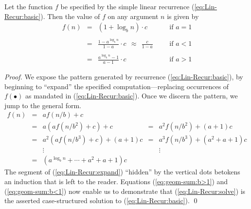 \begin{theorem}
\label{thm:master-thm-simple}
Let the function $f$ be specified by the simple linear recurrence
(\ref{eq:Lin-Recur:basic}).  Then the value of $f$ on any argument $n$
is given by
\begin{equation}
\label{eq:Lin-Recur:solve}
\begin{array}{lcllll}
f(n) & = & (1 + \log_b n) \cdot c &  &  & \mbox{if } a=1 \\
     &   &                 &  &  & \\
     & = &
  {\displaystyle
  \frac{1-a^{\log_b n}}{1-a} \cdot c \ \ \approx \ \ \frac{c}{1-a}
  }
                           &  &  & \mbox{if } a<1 \\
    &   &                  &  &  & \\
    & = &
  {\displaystyle
\frac{a^{\log_b n} -1}{a-1} \cdot c
  }
                           &  &  & \mbox{if } a>1
\end{array}
\end{equation}
\end{theorem}

\begin{proof}
We expose the pattern generated by recurrence
(\ref{eq:Lin-Recur:basic}), by beginning to ``expand'' the specified
computation---replacing occurrences of $f(\bullet)$ as mandated in
(\ref{eq:Lin-Recur:basic}).  Once we discern the pattern, we jump to
the general form.
\begin{equation}
\label{eq:Lin-Recur:expand}
\begin{array}{lcccc}
f(n) & = & a f(n/b) + c & & \\
     & = & a \left( a f(n/b^2) + c \right) + c
             & = & a^2 f(n/b^2) + (a+1)c \\
     & = & a^2 \left( a f(n/b^3) + c \right) + (a+1)c
             & = & a^3 f(n/b^3) + (a^2+a+1)c \\
     &   & \vdots & & \vdots \\
     & = & 
{\displaystyle
\left(a^{\log_b n} + \cdots +a^2+a+1 \right) c
} & &
\end{array}
\end{equation}
The segment of (\ref{eq:Lin-Recur:expand}) ``hidden'' by the vertical
dots betokens an induction that is left to the reader.  Equations
(\ref{eq:geom-sum:b>1}) and (\ref{eq:geom-sum:b<1}) now enable us to
demonstrate that (\ref{eq:Lin-Recur:solve}) is the asserted
case-structured solution to (\ref{eq:Lin-Recur:basic}).  \qed
\end{proof}


